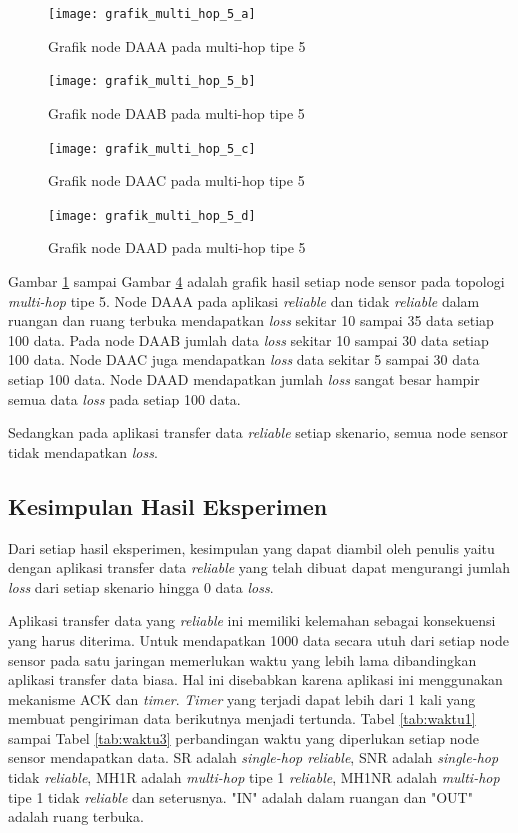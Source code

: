 \begin{figure}[H]
	\centering
	\texttt{[image: grafik\_multi\_hop\_5\_a]}
	\caption{Grafik node DAAA pada multi-hop tipe 5}
	\label{fig:grafik_multi_hop_5_a}
\end{figure}
\begin{figure}[H]
	\centering
	\texttt{[image: grafik\_multi\_hop\_5\_b]}
	\caption{Grafik node DAAB pada multi-hop tipe 5}
	\label{fig:grafik_multi_hop_5_b}
\end{figure}
\begin{figure}[H]
	\centering
	\texttt{[image: grafik\_multi\_hop\_5\_c]}
	\caption{Grafik node DAAC pada multi-hop tipe 5}
	\label{fig:grafik_multi_hop_5_c}
\end{figure}
\begin{figure}[H]
	\centering
	\texttt{[image: grafik\_multi\_hop\_5\_d]}
	\caption{Grafik node DAAD pada multi-hop tipe 5}
	\label{fig:grafik_multi_hop_5_d}
\end{figure}
Gambar \ref{fig:grafik_multi_hop_5_a} sampai Gambar \ref{fig:grafik_multi_hop_5_d} adalah grafik hasil setiap node sensor pada topologi \textit{multi-hop} tipe 5. Node DAAA pada aplikasi \textit{reliable} dan tidak \textit{reliable} dalam ruangan dan ruang terbuka mendapatkan \textit{loss} sekitar 10 sampai 35 data setiap 100 data. Pada node DAAB jumlah data \textit{loss} sekitar 10 sampai 30 data setiap 100 data. Node DAAC juga mendapatkan \textit{loss} data sekitar 5 sampai 30 data setiap 100 data. Node DAAD mendapatkan jumlah \textit{loss} sangat besar hampir semua data \textit{loss} pada setiap 100 data.

Sedangkan pada aplikasi transfer data \textit{reliable} setiap skenario, semua node sensor tidak mendapatkan \textit{loss}.

\subsection{Kesimpulan Hasil Eksperimen}
Dari setiap hasil eksperimen, kesimpulan yang dapat diambil oleh penulis yaitu dengan aplikasi transfer data \textit{reliable} yang telah dibuat dapat mengurangi jumlah \textit{loss} dari setiap skenario hingga 0 data \textit{loss}.

Aplikasi transfer data yang \textit{reliable} ini memiliki kelemahan sebagai konsekuensi yang harus diterima. Untuk mendapatkan 1000 data secara utuh dari setiap node sensor pada satu jaringan memerlukan waktu yang lebih lama dibandingkan aplikasi transfer data biasa. Hal ini disebabkan karena aplikasi ini menggunakan mekanisme ACK dan \textit{timer}. \textit{Timer} yang terjadi dapat lebih dari 1 kali yang membuat pengiriman data berikutnya menjadi tertunda. Tabel \ref{tab:waktu1} sampai Tabel \ref{tab:waktu3} perbandingan waktu yang diperlukan setiap node sensor mendapatkan data. SR adalah \textit{single-hop reliable}, SNR adalah \textit{single-hop} tidak \textit{reliable}, MH1R adalah \textit{multi-hop} tipe 1 \textit{reliable}, MH1NR adalah \textit{multi-hop} tipe 1 tidak \textit{reliable} dan seterusnya. "IN" adalah dalam ruangan dan "OUT" adalah ruang terbuka.

